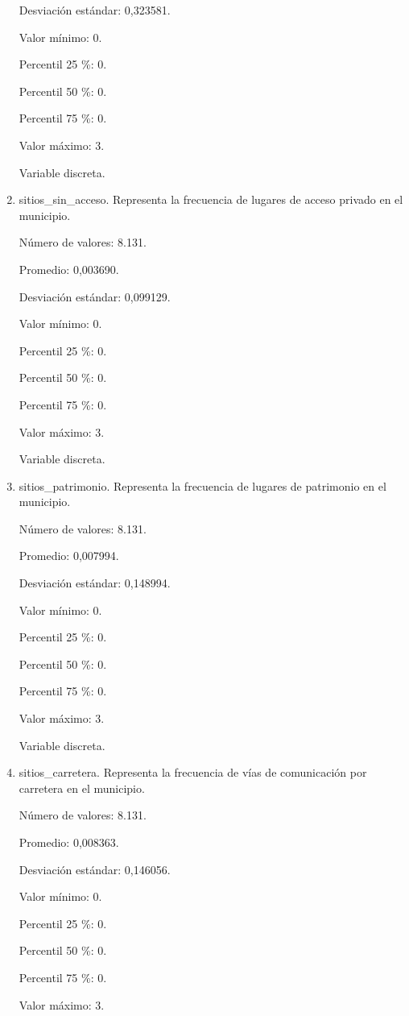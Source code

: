 \begin{enumerate}
	Desviación estándar: 0,323581.
	
	Valor mínimo: 0.
	
	Percentil 25 \%: 0.
	
	Percentil 50 \%: 0.
	
	Percentil 75 \%: 0.
	
	Valor máximo: 3.
	
	Variable discreta.

	\item sitios\_sin\_acceso. Representa la frecuencia de lugares de acceso privado en el municipio.
	
	Número de valores: 8.131.
	
	Promedio: 0,003690.
	
	Desviación estándar: 0,099129.
	
	Valor mínimo: 0.
	
	Percentil 25 \%: 0.
	
	Percentil 50 \%: 0.
	
	Percentil 75 \%: 0.
	
	Valor máximo: 3.
	
	Variable discreta.

	\item sitios\_patrimonio. Representa la frecuencia de lugares de patrimonio en el municipio.
	
	Número de valores: 8.131.
	
	Promedio: 0,007994.
	
	Desviación estándar: 0,148994.
	
	Valor mínimo: 0.
	
	Percentil 25 \%: 0.
	
	Percentil 50 \%: 0.
	
	Percentil 75 \%: 0.
	
	Valor máximo: 3.
	
	Variable discreta.

	\item sitios\_carretera. Representa la frecuencia de vías de comunicación por carretera en el municipio.
	
	Número de valores: 8.131.
	
	Promedio: 0,008363.
	
	Desviación estándar: 0,146056.
	
	Valor mínimo: 0.
	
	Percentil 25 \%: 0.
	
	Percentil 50 \%: 0.
	
	Percentil 75 \%: 0.
	
	Valor máximo: 3.
	

\end{enumerate}
